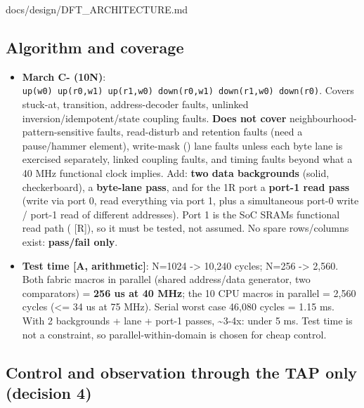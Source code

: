 \begin{relocated}{docs/design/DFT_ARCHITECTURE.md}
\subsection{Algorithm and coverage}\label{tm:ch:dft-architecture:61-algorithm-and-coverage}

\begin{itemize}
\tightlist
\item
  \textbf{March C- (10N)}:
  \texttt{up(w0)\ up(r0,\allowbreak{}w1)\ up(r1,\allowbreak{}w0)\ down(r0,\allowbreak{}w1)\ down(r1,\allowbreak{}w0)\ down(r0)}.
  Covers stuck-at, transition, address-decoder faults, unlinked
  inversion/\allowbreak{}idempotent/\allowbreak{}state coupling faults.
  \textbf{Does not cover} neighbourhood-pattern-sensitive faults,
  read-disturb and retention faults (need a pause/\allowbreak{}hammer
  element), write-mask () lane faults unless each byte lane
  is exercised separately, linked coupling faults, and timing faults
  beyond what a 40 MHz functional clock implies. Add: \textbf{two data
  backgrounds} (solid, checkerboard), a \textbf{byte-lane pass}, and for
  the 1R port a \textbf{port-1 read pass} (write via port 0, read
  everything via port 1, plus a simultaneous port-0 write / port-1 read
  of different addresses). Port 1 is the SoC SRAM\textquotesingle s
  functional read path ( {[}R{]}), so
  it must be tested, not assumed. No spare rows/\allowbreak{}columns
  exist: \textbf{pass/fail only}.
\item
  \textbf{Test time {[}A, arithmetic{]}}: N=1024 -\textgreater{} 10,240
  cycles; N=256 -\textgreater{} 2,560. Both fabric macros in parallel
  (shared address/\allowbreak{}data generator, two comparators) =
  \textbf{256 us at 40 MHz}; the 10 CPU macros in parallel = 2,560
  cycles (\textless= 34 us at 75 MHz). Serial worst case 46,080 cycles =
  1.15 ms. With 2 backgrounds + lane + port-1 passes,
  \textasciitilde3-4x: under 5 ms. Test time is not a constraint, so
  parallel-within-domain is chosen for cheap control.
\end{itemize}

\subsection{Control and observation through the TAP only (decision
4)}\label{tm:ch:dft-architecture:62-control-and-observation-through-the-tap-only-decision-4}


\end{relocated}
